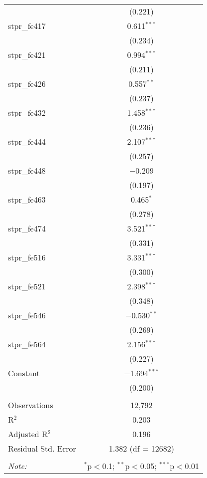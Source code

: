 \begin{table}[!htbp]
\begin{tabular}{@{\extracolsep{5pt}}lc}
  & (0.221) \\ 
  stpr\_fe417 & 0.611$^{***}$ \\ 
  & (0.234) \\ 
  stpr\_fe421 & 0.994$^{***}$ \\ 
  & (0.211) \\ 
  stpr\_fe426 & 0.557$^{**}$ \\ 
  & (0.237) \\ 
  stpr\_fe432 & 1.458$^{***}$ \\ 
  & (0.236) \\ 
  stpr\_fe444 & 2.107$^{***}$ \\ 
  & (0.257) \\ 
  stpr\_fe448 & $-$0.209 \\ 
  & (0.197) \\ 
  stpr\_fe463 & 0.465$^{*}$ \\ 
  & (0.278) \\ 
  stpr\_fe474 & 3.521$^{***}$ \\ 
  & (0.331) \\ 
  stpr\_fe516 & 3.331$^{***}$ \\ 
  & (0.300) \\ 
  stpr\_fe521 & 2.398$^{***}$ \\ 
  & (0.348) \\ 
  stpr\_fe546 & $-$0.530$^{**}$ \\ 
  & (0.269) \\ 
  stpr\_fe564 & 2.156$^{***}$ \\ 
  & (0.227) \\ 
  Constant & $-$1.694$^{***}$ \\ 
  & (0.200) \\ 
 \hline \\[-1.8ex] 
Observations & 12,792 \\ 
R$^{2}$ & 0.203 \\ 
Adjusted R$^{2}$ & 0.196 \\ 
Residual Std. Error & 1.382 (df = 12682) \\ 
\hline 
\hline \\[-1.8ex] 
\textit{Note:}  & \multicolumn{1}{r}{$^{*}$p$<$0.1; $^{**}$p$<$0.05; $^{***}$p$<$0.01} \\ 
\end{tabular} 
\end{table} 
